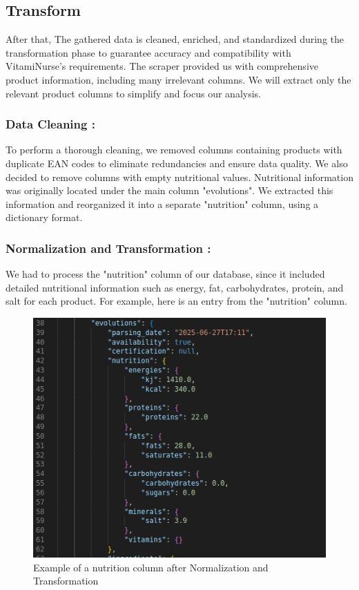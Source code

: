 \subsection{Transform}
After that, The gathered data is cleaned, enriched, and standardized
during the transformation phase to guarantee accuracy and compatibility with VitamiNurse’s requirements.
The scraper provided us with comprehensive product information, including many irrelevant columns. We will extract only the relevant product columns to simplify and focus our
analysis.

\subsubsection{Data Cleaning :}

\par To perform a thorough cleaning, we removed columns
containing products with duplicate EAN codes to eliminate redundancies
and ensure data quality. We also decided to remove columns with
empty nutritional values. Nutritional information was originally located
under the main column "evolutions". We extracted this information and
reorganized it into a separate "nutrition" column, using a dictionary
format.


\subsubsection{Normalization and Transformation :}

\par We had to process the "nutrition" column of our database, since it included detailed nutritional information such as energy, fat, carbohydrates,
protein, and salt for each product. For example, here is an entry from
the "nutrition" column.

\begin{center}
\begin{figure}[H]
    \centering
    \includegraphics[scale=0.45]{images/transform_nutrition.png}
    \caption{Example of a nutrition column after Normalization and Transformation} 
    \label{fig:Normalization_nutrition}
\end{figure}
\end{center}

